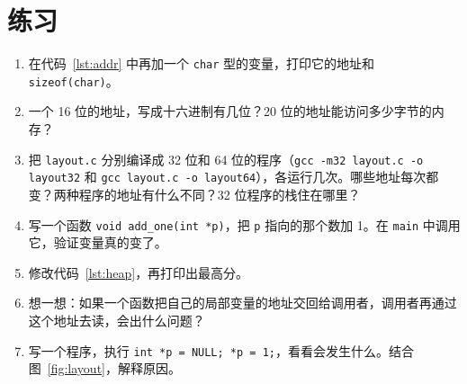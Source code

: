 \section*{练习}

\begin{enumerate}
  \item 在代码~\ref{lst:addr} 中再加一个 \texttt{char} 型的变量，打印它的地址和 \texttt{sizeof(char)}。
  \item 一个 16 位的地址，写成十六进制有几位？20 位的地址能访问多少字节的内存？
  \item 把 \texttt{layout.c} 分别编译成 32 位和 64 位的程序（\texttt{gcc -m32 layout.c -o layout32} 和 \texttt{gcc layout.c -o layout64}），各运行几次。哪些地址每次都变？两种程序的地址有什么不同？32 位程序的栈住在哪里？
  \item 写一个函数 \texttt{void add\_one(int *p)}，把 \texttt{p} 指向的那个数加 1。在 \texttt{main} 中调用它，验证变量真的变了。
  \item 修改代码~\ref{lst:heap}，再打印出最高分。
  \item 想一想：如果一个函数把自己的局部变量的地址交回给调用者，调用者再通过这个地址去读，会出什么问题？
  \item 写一个程序，执行 \texttt{int *p = NULL; *p = 1;}，看看会发生什么。结合图~\ref{fig:layout}，解释原因。
\end{enumerate}
